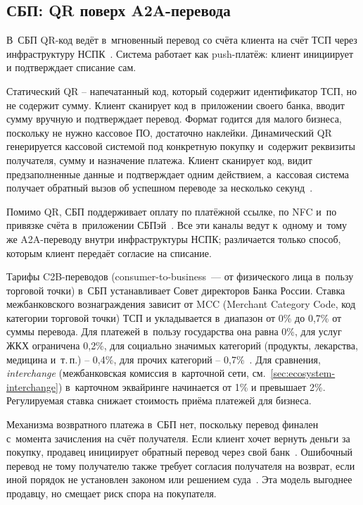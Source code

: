 \subsection*{СБП: QR поверх A2A-перевода}

В~СБП QR-код ведёт в~мгновенный перевод со счёта клиента на счёт
ТСП через инфраструктуру НСПК~\cite{sbp-main}. Система работает
как push-платёж: клиент инициирует и подтверждает списание сам.

Статический QR -- напечатанный код, который содержит
идентификатор ТСП, но не содержит сумму. Клиент сканирует код
в~приложении своего банка, вводит сумму вручную и подтверждает перевод.
Формат годится для малого бизнеса, поскольку не нужно кассовое ПО,
достаточно наклейки. Динамический QR генерируется кассовой системой
под конкретную покупку и~содержит реквизиты получателя, сумму
и назначение платежа. Клиент сканирует код, видит предзаполненные
данные и подтверждает одним действием, а~кассовая система получает
обратный вызов об успешном переводе за несколько
секунд~\cite{sbp-faq-business}.

Помимо QR, СБП поддерживает оплату по платёжной ссылке, по NFC
и~по привязке счёта в~приложении
СБПэй~\cite{sbpay-app,sbp-main}. Все эти каналы ведут к~одному
и~тому же A2A-переводу внутри инфраструктуры НСПК; различается
только способ, которым клиент передаёт согласие на списание.

Тарифы C2B-переводов (consumer-to-business~--- от физического лица
в~пользу торговой точки) в~СБП устанавливает Совет директоров Банка
России. Ставка межбанковского вознаграждения зависит от MCC
(Merchant Category Code, код категории торговой точки) ТСП
и укладывается в~диапазон от 0\% до 0{,}7\% от суммы
перевода. Для платежей в~пользу государства она равна 0\%, для услуг ЖКХ
ограничена 0{,}2\%, для социально значимых категорий
(продукты, лекарства, медицина и~т.\,п.) -- 0{,}4\%, для прочих
категорий -- 0{,}7\%~\cite{cbr-sbp-c2b-tariffs}. Для сравнения,
\textit{interchange} (межбанковская комиссия в~карточной сети,
см.~\ref{sec:ecosystem-interchange}) в~карточном эквайринге
начинается от 1\% и превышает 2\%.
Регулируемая ставка снижает стоимость приёма платежей для бизнеса.

Механизма возвратного платежа в~СБП нет, поскольку перевод финален
с~момента зачисления на счёт получателя. Если клиент хочет вернуть
деньги за покупку, продавец инициирует обратный перевод через свой
банк~\cite{sbp-faq-business}. Ошибочный перевод не тому получателю
также требует согласия получателя на возврат, если иной
порядок не установлен законом или решением
суда~\cite{cbr-sbp-faq-mistaken-transfer}. Эта модель выгоднее
продавцу, но смещает риск спора на покупателя.

